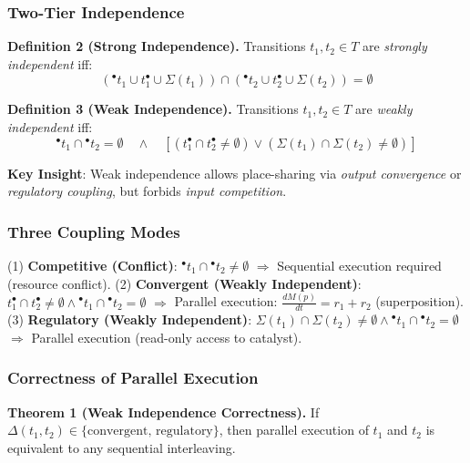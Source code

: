 \documentclass[twocolumn,11pt]{article}
\newcommand{\preset}[1]{\ensuremath{{}^{\bullet}#1}}
\newcommand{\postset}[1]{\ensuremath{#1^{\bullet}}}
\newcommand{\RegSet}[1]{\ensuremath{\Sigma(#1)}}
\newcommand{\DepType}[2]{\ensuremath{\Delta(#1,#2)}}
\begin{document}
\subsubsection{Two-Tier Independence}

{\small
\textbf{Definition 2 (Strong Independence).}
Transitions $t_1, t_2 \in T$ are \emph{strongly independent} iff:
\begin{equation}
(\preset{t_1} \cup \postset{t_1} \cup \RegSet{t_1}) \cap (\preset{t_2} \cup \postset{t_2} \cup \RegSet{t_2}) = \emptyset
\end{equation}
}

{\small
\textbf{Definition 3 (Weak Independence).}
Transitions $t_1, t_2 \in T$ are \emph{weakly independent} iff:
\begin{equation}
\preset{t_1} \cap \preset{t_2} = \emptyset \quad \land \quad [(\postset{t_1} \cap \postset{t_2} \neq \emptyset) \lor (\RegSet{t_1} \cap \RegSet{t_2} \neq \emptyset)]
\end{equation}
}

\textbf{Key Insight}: Weak independence allows place-sharing via \emph{output convergence} or \emph{regulatory coupling}, but forbids \emph{input competition}.

\subsubsection{Three Coupling Modes}
(1) \textbf{Competitive (Conflict)}: $\preset{t_1} \cap \preset{t_2} \neq \emptyset$ $\Rightarrow$ Sequential execution required (resource conflict).
(2) \textbf{Convergent (Weakly Independent)}: $\postset{t_1} \cap \postset{t_2} \neq \emptyset \land \preset{t_1} \cap \preset{t_2} = \emptyset$ $\Rightarrow$ Parallel execution: $\frac{dM(p)}{dt} = r_1 + r_2$ (superposition).
(3) \textbf{Regulatory (Weakly Independent)}: $\RegSet{t_1} \cap \RegSet{t_2} \neq \emptyset \land \preset{t_1} \cap \preset{t_2} = \emptyset$ $\Rightarrow$ Parallel execution (read-only access to catalyst).

\subsubsection{Correctness of Parallel Execution}

{\small
\textbf{Theorem 1 (Weak Independence Correctness).}
If $\DepType{t_1}{t_2} \in \{\text{convergent, regulatory}\}$, then parallel execution of $t_1$ and $t_2$ is equivalent to any sequential interleaving.
}
\end{document}
